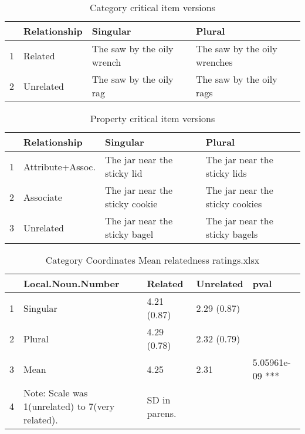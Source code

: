 \documentclass[a4paper,11pt]{article}\usepackage[]{graphicx}\usepackage[]{color}
\begin{document}
\begin{table}[ht]
\centering
\begin{tabular}{rlll}
  \hline
 & Relationship & Singular & Plural \\ 
  \hline
1 & Related & The saw by the oily wrench & The saw by the oily wrenches \\ 
  2 & Unrelated & The saw by the oily rag & The saw by the oily rags \\ 
   \hline
\end{tabular}
\caption[Category Item]{Category critical item versions} 
\end{table}


\begin{table}[ht]
\centering
\begin{tabular}{rlll}
  \hline
 & Relationship & Singular & Plural \\ 
  \hline
1 & Attribute+Assoc. & The jar near the sticky lid & The jar near the sticky lids \\ 
  2 & Associate & The jar near the sticky cookie & The jar near the sticky cookies \\ 
  3 & Unrelated & The jar near the sticky bagel & The jar near the sticky bagels \\ 
   \hline
\end{tabular}
\caption[Property Item]{Property critical item versions} 
\end{table}


\begin{table}[ht]
\centering
\begin{tabular}{rllll}
  \hline
 & Local.Noun.Number & Related & Unrelated & pval \\ 
  \hline
1 & Singular & 4.21 (0.87) & 2.29 (0.87) &   \\ 
  2 & Plural & 4.29 (0.78) & 2.32 (0.79) &   \\ 
  3 & Mean & 4.25 & 2.31 & 5.05961e-09 *** \\ 
  4 & Note: Scale was 1(unrelated) to 7(very related). & SD in parens. &   &   \\ 
   \hline
\end{tabular}
\caption[CAT COORD Relatedness]{Category Coordinates Mean relatedness ratings.xlsx} 
\end{table}
\end{document}
